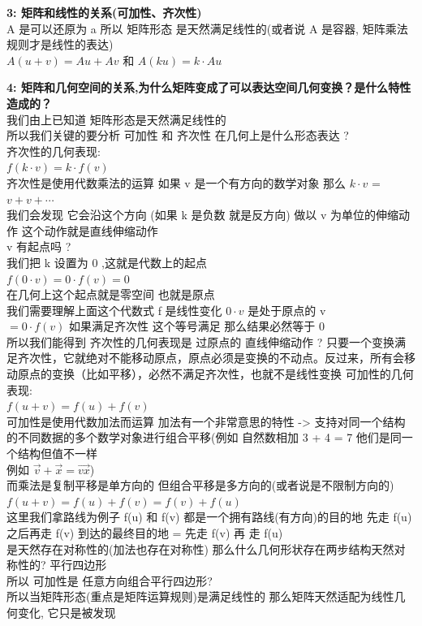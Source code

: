 \documentclass[12pt]{article}
\begin{document}
\begin{flushleft}
    \vspace{0.5em}
    \noindent\textbf{3: 矩阵和线性的关系(可加性、齐次性)} \\
    A 是可以还原为 a 所以 矩阵形态 是天然满足线性的(或者说 A 是容器, 矩阵乘法规则才是线性的表达)\\
    $A(u+v)  = Au + Av$ 和 $A(ku)  = k \cdot Au$


    \vspace{0.5em}
    \noindent\textbf{4: 矩阵和几何空间的关系,为什么矩阵变成了可以表达空间几何变换？是什么特性造成的？} \\
    我们由上已知道 矩阵形态是天然满足线性的 \\
    所以我们关键的要分析 可加性 和 齐次性 在几何上是什么形态表达 ? \\
    齐次性的几何表现:  \\
    $f(k \cdot v) = k \cdot f(v)$ \\
    齐次性是使用代数乘法的运算 如果 v 是一个有方向的数学对象 那么 $k \cdot v$ = $v + v + \cdots$ \\
    我们会发现 它会沿这个方向 (如果 k 是负数 就是反方向) 做以 v 为单位的伸缩动作 这个动作就是直线伸缩动作 \\
    v 有起点吗 ? \\
    我们把 k 设置为 0 ,这就是代数上的起点  \\
    $f(0 \cdot v) = 0 \cdot f(v) = 0$ \\
    在几何上这个起点就是零空间 也就是原点 \\
    我们需要理解上面这个代数式 f 是线性变化  $0 \cdot v$ 是处于原点的 v \\
    $= 0 \cdot f(v)$ 如果满足齐次性 这个等号满足 那么结果必然等于 0 \\
    所以我们能得到 齐次性的几何表现是 过原点的 直线伸缩动作 ?
    只要一个变换满足齐次性，它就绝对不能移动原点，原点必须是变换的不动点。反过来，所有会移动原点的变换（比如平移），必然不满足齐次性，也就不是线性变换
    可加性的几何表现:  \\
    $f(u+v) = f(u) + f(v)$ \\
    可加性是使用代数加法而运算 加法有一个非常意思的特性 -> 支持对同一个结构的不同数据的多个数学对象进行组合平移(例如 自然数相加 3 + 4 = 7 他们是同一个结构但值不一样 \\
    例如 $\vec{v} + \vec{x} = \vec{vx} $) \\
    而乘法是复制平移是单方向的 但组合平移是多方向的(或者说是不限制方向的) \\
    $f(u+v) = f(u) + f(v) = f(v) + f(u)$ \\
    这里我们拿路线为例子 f(u) 和 f(v) 都是一个拥有路线(有方向)的目的地 先走 f(u) 之后再走 f(v) 到达的最终目的地  = 先走 f(v) 再 走 f(u) \\
    是天然存在对称性的(加法也存在对称性) 那么什么几何形状存在两步结构天然对称性的? 平行四边形 \\
    所以 可加性是 任意方向组合平行四边形? \\

    所以当矩阵形态(重点是矩阵运算规则)是满足线性的 那么矩阵天然适配为线性几何变化, 它只是被发现 \\

\end{flushleft}
\end{document}
